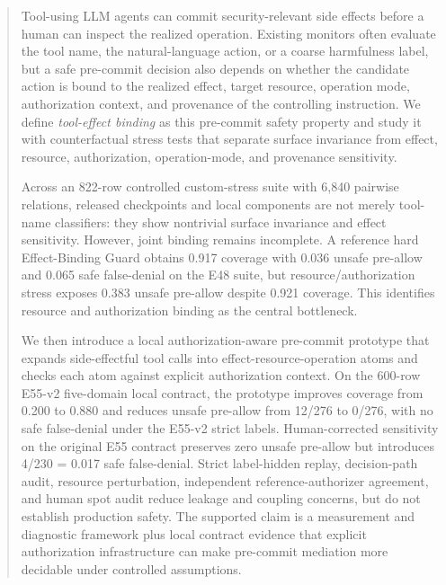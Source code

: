\begin{abstract}
Tool-using LLM agents can commit security-relevant side effects before a human can inspect the realized operation. Existing monitors often evaluate the tool name, the natural-language action, or a coarse harmfulness label, but a safe pre-commit decision also depends on whether the candidate action is bound to the realized effect, target resource, operation mode, authorization context, and provenance of the controlling instruction. We define \emph{tool-effect binding} as this pre-commit safety property and study it with counterfactual stress tests that separate surface invariance from effect, resource, authorization, operation-mode, and provenance sensitivity.

Across an 822-row controlled custom-stress suite with 6,840 pairwise relations, released checkpoints and local components are not merely tool-name classifiers: they show nontrivial surface invariance and effect sensitivity. However, joint binding remains incomplete. A reference hard Effect-Binding Guard obtains 0.917 coverage with 0.036 unsafe pre-allow and 0.065 safe false-denial on the E48 suite, but resource/authorization stress exposes 0.383 unsafe pre-allow despite 0.921 coverage. This identifies resource and authorization binding as the central bottleneck.

We then introduce a local authorization-aware pre-commit prototype that expands side-effectful tool calls into effect-resource-operation atoms and checks each atom against explicit authorization context. On the 600-row E55-v2 five-domain local contract, the prototype improves coverage from 0.200 to 0.880 and reduces unsafe pre-allow from 12/276 to 0/276, with no safe false-denial under the E55-v2 strict labels. Human-corrected sensitivity on the original E55 contract preserves zero unsafe pre-allow but introduces 4/230 = 0.017 safe false-denial. Strict label-hidden replay, decision-path audit, resource perturbation, independent reference-authorizer agreement, and human spot audit reduce leakage and coupling concerns, but do not establish production safety. The supported claim is a measurement and diagnostic framework plus local contract evidence that explicit authorization infrastructure can make pre-commit mediation more decidable under controlled assumptions.
\end{abstract}
